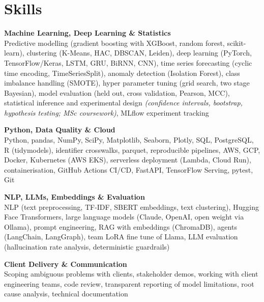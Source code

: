 \documentclass[a4paper,11pt]{article}
\newcommand{\skillgroup}[2]{{\color{headernavy}\textbf{#1}}\\ #2\par\vspace{3pt}}
\begin{document}
\section{Skills}
\skillgroup{Machine Learning, Deep Learning \& Statistics}{Predictive modelling (gradient boosting with XGBoost, random forest, scikit-learn), clustering (K-Means, HAC, DBSCAN, Leiden), deep learning (PyTorch, TensorFlow/Keras, LSTM, GRU, BiRNN, CNN), time series forecasting (cyclic time encoding, TimeSeriesSplit), anomaly detection (Isolation Forest), class imbalance handling (SMOTE), hyper parameter tuning (grid search, two stage Bayesian), model evaluation (held out, cross validation, Pearson, MCC), statistical inference and experimental design \textit{(confidence intervals, bootstrap, hypothesis testing; MSc coursework)}, MLflow experiment tracking}
\skillgroup{Python, Data Quality \& Cloud}{Python, pandas, NumPy, SciPy, Matplotlib, Seaborn, Plotly, SQL, PostgreSQL, R (tidymodels), identifier crosswalks, parquet, reproducible pipelines, AWS, GCP, Docker, Kubernetes (AWS EKS), serverless deployment (Lambda, Cloud Run), containerisation, GitHub Actions CI/CD, FastAPI, TensorFlow Serving, pytest, Git}
\skillgroup{NLP, LLMs, Embeddings \& Evaluation}{NLP (text preprocessing, TF-IDF, SBERT embeddings, text clustering), Hugging Face Transformers, large language models (Claude, OpenAI, open weight via Ollama), prompt engineering, RAG with embeddings (ChromaDB), agents (LangChain, LangGraph), team LoRA fine tune of Llama, LLM evaluation (hallucination rate analysis, deterministic guardrails)}
\skillgroup{Client Delivery \& Communication}{Scoping ambiguous problems with clients, stakeholder demos, working with client engineering teams, code review, transparent reporting of model limitations, root cause analysis, technical documentation}
\end{document}

